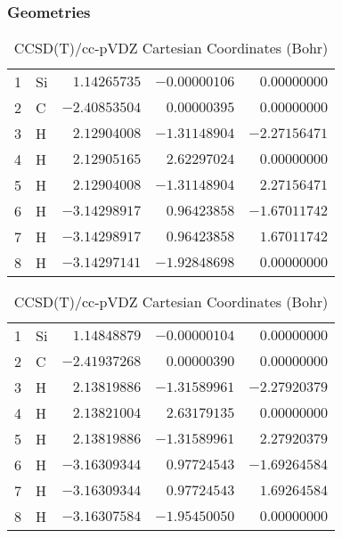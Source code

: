 \documentclass[10pt,oneside]{article}
\begin{document}
\clearpage

\subsection{}

\begin{table}[h!]
\subsubsection*{Geometries}
\begin{multicols}{2}
\centering
\caption{CCSD(T)/cc-pVTZ Cartesian Coordinates (Bohr)}
\begin{tabular}{llrrr}
\toprule
1  & Si & $ 1.14265735$ & $-0.00000106$ & $ 0.00000000$ \\
2  & C  & $-2.40853504$ & $ 0.00000395$ & $ 0.00000000$ \\
3  & H  & $ 2.12904008$ & $-1.31148904$ & $-2.27156471$ \\
4  & H  & $ 2.12905165$ & $ 2.62297024$ & $ 0.00000000$ \\
5  & H  & $ 2.12904008$ & $-1.31148904$ & $ 2.27156471$ \\
6  & H  & $-3.14298917$ & $ 0.96423858$ & $-1.67011742$ \\
7  & H  & $-3.14298917$ & $ 0.96423858$ & $ 1.67011742$ \\
8  & H  & $-3.14297141$ & $-1.92848698$ & $ 0.00000000$ \\
\bottomrule
\end{tabular}
\caption{CCSD(T)/cc-pVDZ Cartesian Coordinates (Bohr)}
\begin{tabular}{llrrr}
\toprule
1  & Si & $ 1.14848879$ & $-0.00000104$ & $ 0.00000000$ \\
2  & C  & $-2.41937268$ & $ 0.00000390$ & $ 0.00000000$ \\
3  & H  & $ 2.13819886$ & $-1.31589961$ & $-2.27920379$ \\
4  & H  & $ 2.13821004$ & $ 2.63179135$ & $ 0.00000000$ \\
5  & H  & $ 2.13819886$ & $-1.31589961$ & $ 2.27920379$ \\
6  & H  & $-3.16309344$ & $ 0.97724543$ & $-1.69264584$ \\
7  & H  & $-3.16309344$ & $ 0.97724543$ & $ 1.69264584$ \\
8  & H  & $-3.16307584$ & $-1.95450050$ & $ 0.00000000$ \\
\bottomrule
\end{tabular}
\end{multicols}
\end{table}
\end{document}

